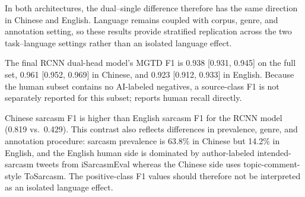In both architectures, the dual--single difference therefore has the same direction in Chinese and English. Language remains coupled with corpus, genre, and annotation setting, so these results provide stratified replication across the two task--language settings rather than an isolated language effect.

\begin{table}[t]
  \centering
  \small
  \setlength{\tabcolsep}{4pt}
  \caption{Per-language and human-subset sarcasm F1 (final models; bootstrap 95\% intervals included for RCNN).}
  \label{tab:lang-f1}
\end{table}

The final RCNN dual-head model's MGTD F1 is 0.938 [0.931, 0.945] on the full set, 0.961 [0.952, 0.969] in Chinese, and 0.923 [0.912, 0.933] in English. Because the human subset contains no AI-labeled negatives, a source-class F1 is not separately reported for this subset;  reports human recall directly.

Chinese sarcasm F1 is higher than English sarcasm F1 for the RCNN model (0.819 vs.\ 0.429). This contrast also reflects differences in prevalence, genre, and annotation procedure: sarcasm prevalence is 63.8\% in Chinese but 14.2\% in English, and the English human side is dominated by author-labeled intended-sarcasm tweets from iSarcasmEval whereas the Chinese side uses topic-comment-style ToSarcasm. The positive-class F1 values should therefore not be interpreted as an isolated language effect.

